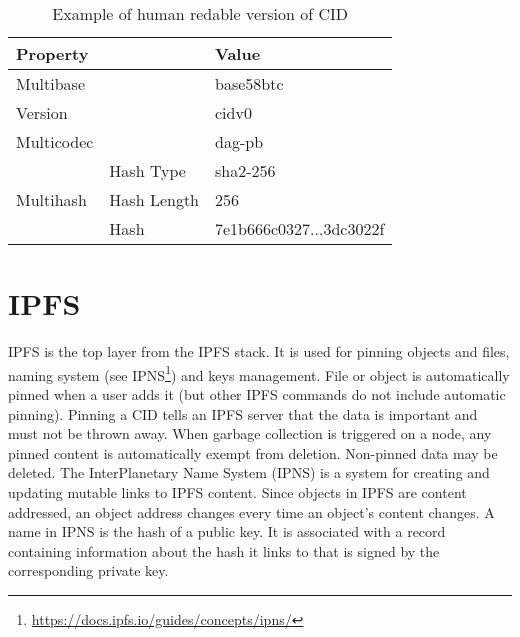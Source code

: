 \begin{table}[]
    \centering
    \begin{tabular}{|ll|l|}
    \hline
    \textbf{Property}                  &             & \textbf{Value}                                                            \\ \hline
    Multibase                                        &             & base58btc                                                        \\ \hline
    Version                                          &             & cidv0                                                            \\ \hline
    Multicodec                                       &             & dag-pb                                                           \\ \hline
    \multicolumn{1}{|l|}{\multirow{3}{*}{Multihash}} & Hash Type   & sha2-256                                                         \\ \cline{2-3} 
    \multicolumn{1}{|l|}{}                           & Hash Length & 256                                                              \\ \cline{2-3} 
    \multicolumn{1}{|l|}{}                           & Hash        & 7e1b666c0327...3dc3022f \\ \hline
    \end{tabular}
    \caption{Example of human redable version of CID}
    \label{tab:CIDexample}
\end{table}

\section{IPFS}
IPFS is the top layer from the IPFS stack. It is used for pinning objects and files, naming system (see IPNS\footnote{\url{https://docs.ipfs.io/guides/concepts/ipns/}}) and keys management. File or object is automatically pinned when a user adds it (but other IPFS commands do not include automatic pinning). Pinning a CID tells an IPFS server that the data is important and must not be thrown away. When garbage collection is triggered on a node, any pinned content is automatically exempt from deletion. Non-pinned data may be deleted. The InterPlanetary Name System (IPNS) is a system for creating and updating mutable links to IPFS content. Since objects in IPFS are content addressed, an object address changes every time an object's content changes. A name in IPNS is the hash of a public key. It is associated with a record containing information about the hash it links to that is signed by the corresponding private key.

